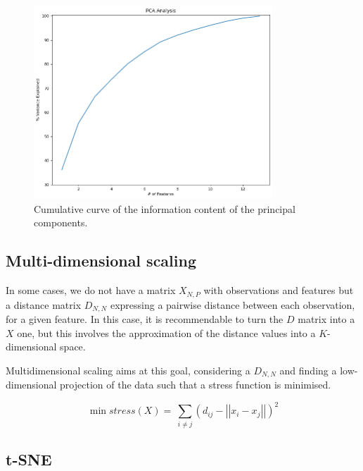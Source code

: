 \begin{figure}[hbt!]
\centering
\includegraphics[width=0.8\textwidth]{SectionLetsMath/dimensionalityReduction_figures/fig_PCAinformation.png}
\captionsetup{type=table}
\caption{Cumulative curve of the information content of the principal components.}
\label{fig_PCAinformation}
\end{figure}

\subsection{Multi-dimensional scaling} \label{secMultiDimensionalScaling}
In some cases, we do not have a matrix $X_{N,P}$ with observations and features but a distance matrix $D_{N,N}$ expressing a pairwise distance between each observation, for a given feature. In this case, it is recommendable to turn the $D$ matrix into a $X$ one, but this involves the approximation of the distance values into a $K$-dimensional space.\par

Multidimensional scaling aims at this goal, considering a $D_{N,N}$ and finding a low-dimensional projection of the data such that a stress function is minimised.

\begin{equation}
    \min stress\left(X\right)=\ {\sum_{i\neq j}\left(d_{ij}-\left|\left|x_i-x_j\right|\right|\right)}^2
    \label{eq_MDS}
\end{equation}

\subsection{t-SNE}

